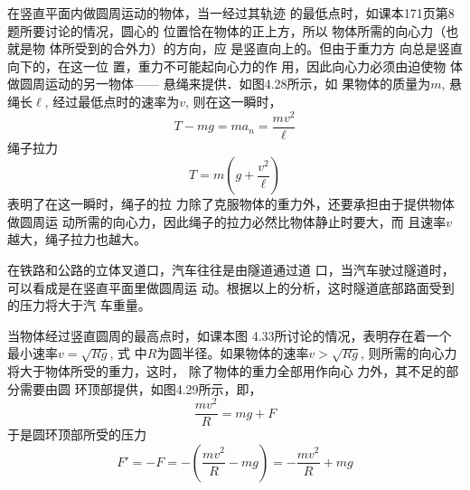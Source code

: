 在竖直平面内做圆周运动的物体，当一经过其轨迹
的最低点时，如课本171页第8题所要讨论的情况，圆心的
位置恰在物体的正上方，所以
物体所需的向心力（也就是物
体所受到的合外力）的方向，应
是竖直向上的。但由于重力方
向总是竖直向下的，在这一位
置，重力不可能起向心力的作
用，因此向心力必须由迫使物
体做圆周运动的另一物体——
悬绳来提供．如图4.28所示，如
果物体的质量为$m$, 悬绳长$\ell$, 经过最低点时的速率为$v$, 则在这一瞬时，
\[T-mg=ma_n=\frac{mv^2}{\ell}\]
绳子拉力
\[T=m\left(g+\frac{v^2}{\ell}\right)\]
表明了在这一瞬时，绳子的拉
力除了克服物体的重力外，还要承担由于提供物体做圆周运
动所需的向心力，因此绳子的拉力必然比物体静止时要大，而
且速率$v$越大，绳子拉力也越大。

\begin{figure}[htp]\centering
    \begin{minipage}[t]{0.48\textwidth}
    \centering
{}
    \caption{}
    \end{minipage}
    \begin{minipage}[t]{0.48\textwidth}
    \centering
    \caption{}
    \end{minipage}
    \end{figure}
在铁路和公路的立体叉道口，汽车往往是由隧道通过道
口，当汽车驶过隧道时，可以看成是在竖直平面里做圆周运
动。根据以上的分析，这时隧道底部路面受到的压力将大于汽
车重量。

当物体经过竖直圆周的最高点时，如课本图
4.33所讨论的情况，表明存在着一个最小速率$v=\sqrt{Rg}$, 式
中$R$为圆半径。如果物体的速率$v>\sqrt{Rg}$, 则所需的向心力
将大于物体所受的重力，这时，
除了物体的重力全部用作向心
力外，其不足的部分需要由圆
环顶部提供，如图4.29所示，即，
\[\frac{mv^2}{R}=mg+F\]
于是圆环顶部所受的压力
\[F'=-F=-\left(\frac{mv^2}{R}-mg\right)=-\frac{mv^2}{R}+mg\]

